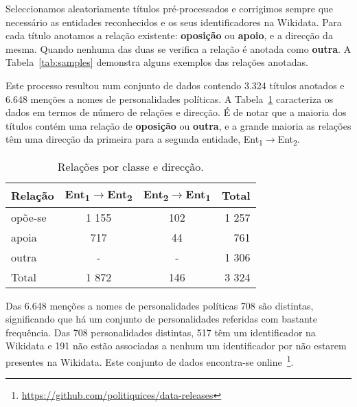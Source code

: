 \documentclass[a4paper, twocolumn, 11pt, twoside]{article}
\begin{document}
Seleccionamos aleatoriamente títulos pré-processados e corrigimos sempre que necessário as entidades reconhecidos e os seus identificadores na Wikidata. Para cada título anotamos a relação existente: \textbf{oposição} ou \textbf{apoio}, e a direcção da mesma. Quando nenhuma das duas se verifica a relação é anotada como \textbf{outra}. A Tabela~\ref{tab:samples} demonstra alguns exemplos das relações anotadas.

Este processo resultou num conjunto de dados contendo 3.324 títulos anotados e 6.648 menções a nomes de personalidades políticas. A Tabela~\ref{tab:rel_dataset} caracteriza os dados em termos de número de relações e direcção. É de notar que a maioria dos títulos contém uma relação de \textbf{oposição} ou \textbf{outra}, e a grande maioria as relações têm uma direcção da primeira para a segunda entidade, Ent\textsubscript{1}$\rightarrow$Ent\textsubscript{2}.


\begin{table}
    \begin{center}
    \begin{tabular}{l ccr}
        {\bf Relação} & {\bf \footnotesize{Ent\textsubscript{1}$\rightarrow$Ent\textsubscript{2}}} & {\bf \footnotesize{Ent\textsubscript{2}$\rightarrow$Ent\textsubscript{1}}} & {\bf Total} \\
        \hline
        opõe-se          &  1 155  &  102  &  1 257  \\
        apoia            &    717  &   44  &    761  \\
        outra            &    -    &   -   &  1 306  \\
		\hline
		Total			 &  1 872  &  146  &  3 324  \\
    \end{tabular}
	\caption{Relações por classe e direcção.}
	\label{tab:rel_dataset}
	\end{center}
\end{table}


Das 6.648 menções a nomes de personalidades políticas 708 são distintas, significando que há um conjunto de personalidades referidas com bastante frequência. Das 708 personalidades distintas, 517 têm um identificador na Wikidata e 191 não estão associadas a nenhum um identificador por não estarem presentes na Wikidata. Este conjunto de dados encontra-se online~\footnote{\url{https://github.com/politiquices/data-releases}}.
\end{document}
